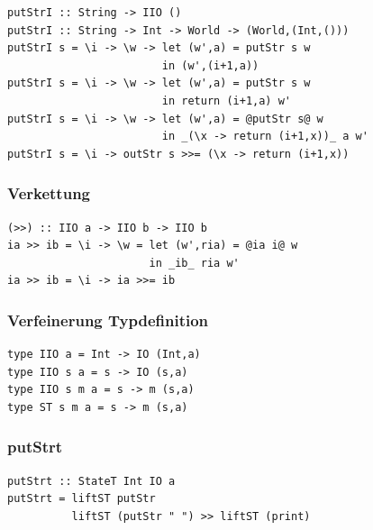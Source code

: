 			\lstHaskell
			\begin{lstlisting}
putStrI :: String -> IIO ()
putStrI :: String -> Int -> World -> (World,(Int,()))
putStrI s = \i -> \w -> let (w',a) = putStr s w
                        in (w',(i+1,a))
putStrI s = \i -> \w -> let (w',a) = putStr s w
                        in return (i+1,a) w'
putStrI s = \i -> \w -> let (w',a) = @putStr s@ w
                        in _(\x -> return (i+1,x))_ a w'
putStrI s = \i -> outStr s >>= (\x -> return (i+1,x))
			\end{lstlisting}


		\subsubsection{Verkettung} %
		\label{ssub:verkettung}
		
			\lstHaskell
			\begin{lstlisting}
(>>) :: IIO a -> IIO b -> IIO b
ia >> ib = \i -> \w = let (w',ria) = @ia i@ w
                      in _ib_ ria w'
ia >> ib = \i -> ia >>= ib
			\end{lstlisting}


		\subsubsection{Verfeinerung Typdefinition} %
		\label{ssub:verfeinerung_typdefinition}
		
			\lstHaskell
			\begin{lstlisting}
type IIO a = Int -> IO (Int,a)
type IIO s a = s -> IO (s,a)
type IIO s m a = s -> m (s,a)
type ST s m a = s -> m (s,a)
			\end{lstlisting}


		\subsubsection{putStrt} %
		\label{ssub:putstrt}
		
			\lstHaskell
			\begin{lstlisting}
putStrt :: StateT Int IO a
putStrt = liftST putStr
          liftST (putStr " ") >> liftST (print)
			\end{lstlisting}




